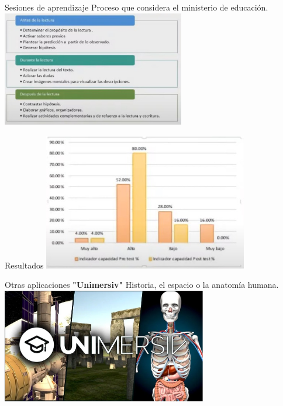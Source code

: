 \documentclass[11pt]{beamer}
\begin{document}
\begin{frame}{Sesiones de aprendizaje}
\center Proceso que considera el ministerio de educación.
\center\includegraphics[width=8cm]{img/Sesiones....jpeg}
\end{frame}

\begin{frame}{Resultados}
\center\includegraphics[height=6cm]{img/ResultadosAM.jpeg}
\end{frame}

\begin{frame}{Otras aplicaciones}
\center\textbf{"Unimersiv"}
Historia, el espacio o la anatomía humana.
\center\includegraphics[height= 5cm]{img/unimersiv.jpeg}
\end{frame}
\end{document}
